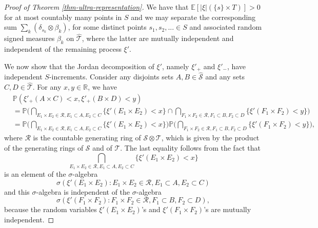 \documentclass{article}
\theoremstyle{plain}
\theoremstyle{remark}
\begin{document}
\begin{proof}[Proof of Theorem \ref{thm-ultra-representation}]
	We have that $\mathbb{E}[|\xi|(\{s\}\times T)]>0$ for at most countably many points in $S$ and we may separate the corresponding sum $\sum_{k}(\delta_{s_k}\otimes\beta_k)$, for some distinct points $s_1,s_2,...\in S$ and associated random signed measures $\beta_k$ on $\hat{\mathcal{T}}$, where the latter are mutually independent and independent of the remaining process $\xi'$. 
	
	We now show that the Jordan decomposition of $\xi'$, namely $\xi'_+$ and $\xi'_-$, have independent $S$-increments. Consider any disjoints sets $A,B\in\hat{\mathcal{S}}$ and any sets $C,D\in\hat{\mathcal{T}}$. For any $x,y\in\mathbb{R}$, we have
	\begin{align*}
		&	\mathbb{P}\left(\xi'_+(A\times C)<x,\xi'_+(B\times D)<y\right)\\&	=	\mathbb{P}\bigg(\bigcap_{E_1\times E_2\in\mathcal{R},E_1\subset A, E_2\subset C}\{\xi'(E_1\times E_2)<x\}\cap\bigcap_{F_1\times F_2\in\mathcal{R},F_1\subset B,F_2\subset D}\{\xi'(F_1\times F_2)<y\}\bigg)\\& 	=	\mathbb{P}\bigg(\bigcap_{E_1\times E_2\in\mathcal{R},E_1\subset A, E_2\subset C}\{\xi'(E_1\times E_2)<x\}\bigg)	\mathbb{P}\bigg(\bigcap_{F_1\times F_2\in\mathcal{R},F_1\subset B,F_2\subset D}\{\xi'(F_1\times F_2)<y\}\bigg),
	\end{align*}
	where $\mathcal{R}$ is the countable generating ring of $\mathcal{S}\otimes\mathcal{T}$, which is given by the product of the generating rings of $\mathcal{S}$ and of $\mathcal{T}$. The last equality follows from the fact that \begin{equation*}
		\bigcap_{E_1\times E_2\in\mathcal{R},E_1\subset A, E_2\subset C}\{\xi'(E_1\times E_2)<x\}
	\end{equation*}
	is an element of the $\sigma$-algebra 
	\begin{equation*}
		\sigma\left(\xi'(E_1\times E_2):E_1\times E_2\in\mathcal{R}, E_1\subset A, E_2\subset C\right)
	\end{equation*}
	and this $\sigma$-algebra is independent of  the $\sigma$-algebra 
	\begin{equation*}
		\sigma\left(\xi'(F_1\times F_2):F_1\times F_2\in\mathcal{R}, F_1\subset B, F_2\subset D\right),
	\end{equation*}
	because the random variables $\xi'(E_1\times E_2)$'s and $\xi'(F_1\times F_2)$'s are mutually independent.
	

\end{proof}
\end{document}
